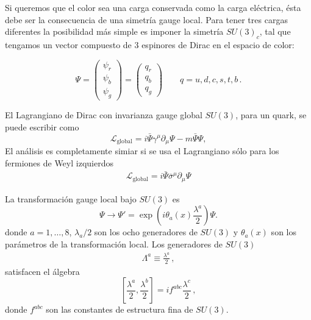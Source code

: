 

Si queremos que el color sea una carga conservada como la carga eléctrica, ésta debe ser la consecuencia de una simetría gauge local. Para tener tres cargas diferentes la posibilidad más simple es imponer la simetría $SU(3)_c$, tal que tengamos un vector compuesto de 3 espinores de Dirac en el espacio de color:

\begin{frame}  
\begin{equation}
  \Psi=
  \begin{pmatrix}
    \psi_r\\
    \psi_b\\
    \psi_g
  \end{pmatrix}
  =
  \begin{pmatrix}
    q_r\\
    q_b\\
    q_g
  \end{pmatrix}\qquad q=u,d,c,s,t,b\,.
\end{equation}
\end{frame}
El Lagrangiano de Dirac con invarianza gauge global $SU(3)$, para un quark, se puede escribir como
\begin{equation}
  \label{eq:128qft}
  \mathcal{L}_{\text{global}}=i\bar{\Psi}\gamma^\mu\partial_\mu\Psi-m\bar{\Psi}\Psi,
\end{equation}
El análisis es completamente simiar si se usa el Lagrangiano sólo para los fermiones de Weyl izquierdos
\begin{align}
    \mathcal{L}_{\text{global}}=i\bar{\Psi}\overline{\sigma}^\mu\partial_\mu\Psi
\end{align}

\begin{frame}
  
La transformación gauge local bajo $SU(3)$ es
\begin{equation}
  \Psi\to \Psi'=\exp\left(i\theta_a(x)\frac{\lambda^a}{2}\right)\Psi.
\end{equation}
donde $a=1,\ldots,8$, $\lambda_a/2$ son los ocho generadores de $SU(3)$ y $\theta_a(x)$ son los parámetros de la transformación local. Los generadores de $SU(3)$
\begin{align}
  \Lambda^a\equiv\frac{\lambda^a}{2}\,,
\end{align}
satisfacen el álgebra
\begin{equation}
  \left[\frac{\lambda^a}{2},\frac{\lambda^b}{2}\right]=if^{abc}\frac{\lambda^c}{2}\,,
\end{equation}
donde $f^{abc}$ son las constantes de estructura fina de $SU(3)$.
\end{frame}

